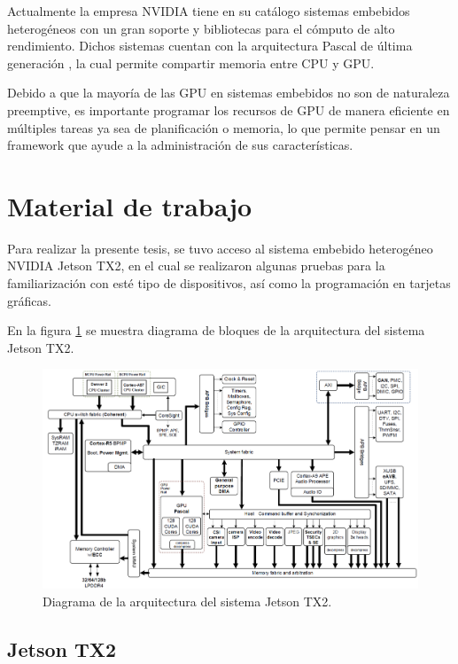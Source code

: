     Actualmente la empresa NVIDIA tiene en su catálogo sistemas embebidos heterogéneos con un gran soporte y bibliotecas para el cómputo de alto rendimiento. Dichos sistemas cuentan con la arquitectura Pascal de última generación \cite{GPUArt}, la cual permite compartir memoria entre CPU y GPU.
   
    Debido a que la mayoría de las GPU en sistemas embebidos no son de naturaleza preemptive, es importante programar los recursos de GPU de manera eficiente en múltiples tareas \cite{TX2I} ya sea de planificación o memoria, lo que permite pensar en un framework que ayude a la administración de sus características. 

 \section{Material de trabajo}
 
Para realizar la presente tesis, se tuvo acceso al sistema embebido heterogéneo NVIDIA Jetson TX2, en el cual se realizaron algunas pruebas para la familiarización con esté tipo de dispositivos, así como la programación en tarjetas gráficas.

En la figura \ref{fig:arqutecturaTX2} se muestra diagrama de bloques de la arquitectura del sistema Jetson TX2.

      \begin{figure}[ht]
      \centering
        \includegraphics[scale=.45]{img/arqutecturaTX2}
        \caption{Diagrama de la arquitectura del sistema Jetson TX2\cite{ArqTX2}.}
        \label{fig:arqutecturaTX2}
    \end{figure}

 \subsection{Jetson TX2}
 
